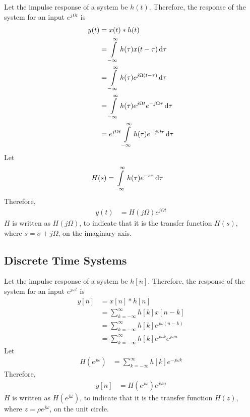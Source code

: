 \documentclass[titlepage, fleqn, a4paper, 12pt, twoside]{article}
\theoremstyle{definition}
\theoremstyle{theorem}
\begin{document}
Let the impulse response of a system be $h(t)$.
Therefore, the response of the system for an input $e^{j \Omega t}$ is
\begin{align*}
	y(t) &= x(t) \ast h(t)\\
	&= \int\limits_{-\infty}^{\infty} h(\tau) x(t - \tau) \dif \tau\\
	&= \int\limits_{-\infty}^{\infty} h(\tau) e^{j \Omega (t - \tau)} \dif \tau\\
	&= \int\limits_{-\infty}^{\infty} h(\tau) e^{j \Omega t} e^{-j \Omega \tau} \dif \tau\\
	&= e^{j \Omega t} \int\limits_{-\infty}^{\infty} h(\tau) e^{-j \Omega \tau} \dif \tau
\end{align*}
Let
\begin{align*}
	H(s) &= \int\limits_{-\infty}^{\infty} h(\tau) e^{-s \tau} \dif \tau
\end{align*}
Therefore,
\begin{align*}
	y(t) &= H(j \Omega) e^{j \Omega t}
\end{align*}
$H$ is written as $H(j \Omega)$, to indicate that it is the transfer function $H(s)$, where $s = \sigma + j \Omega$, on the imaginary axis.

\subsection{Discrete Time Systems}

Let the impulse response of a system be $h[n]$.
Therefore, the response of the system for an input $e^{j \omega t}$ is
\begin{align*}
	y[n] &= x[n] \ast h[n]\\
	&= \sum\limits_{k = -\infty}^{\infty} h[k] x[n - k]\\
	&= \sum\limits_{k = -\infty}^{\infty} h[k] e^{j \omega (n - k)}\\
	&= \sum\limits_{k = -\infty}^{\infty} h[k] e^{j \omega k} e^{j \omega n}
\end{align*}
Let
\begin{align*}
	H\left( e^{j \omega} \right) &= \sum\limits_{k = -\infty}^{\infty} h[k] e^{-j \omega k}
\end{align*}
Therefore,
\begin{align*}
	y[n] &= H\left( e^{j \omega} \right) e^{j \omega n}
\end{align*}
$H$ is written as $H\left( e^{j \omega} \right)$, to indicate that it is the transfer function $H(z)$, where $z = \rho e^{j \omega}$, on the unit circle.
\end{document}
